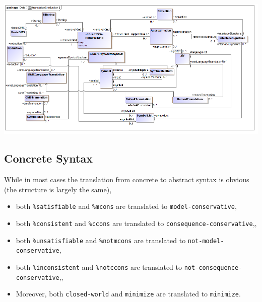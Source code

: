 \documentclass[10pt,fleqn,final]{scrreprt}
\makeatletter
\newcommand*\CommentAuthor{}
\renewcommand*\CommentAuthor{#1}}
\newcommand*\CommentDate{}
\renewcommand*\CommentDate{#1}}
\newcommand*\CommentId{}
\renewcommand*\CommentId{#1}}
\newcommand*\CommentType{}
\renewcommand*\CommentType{#1}}
\newcommand*{\SetCommentColorByType}[1]{%
\edef\localType{{#1}}%
\expandafter\ifstrequal\localType{q-aut}{\colorlet{CommentColor}{red}}{%
\expandafter\ifstrequal\localType{q-all}{\colorlet{CommentColor}{orange}}{%
\expandafter\ifstrequal\localType{todo}{\colorlet{CommentColor}{orange}}{%
\expandafter\ifstrequal\localType{fyi}{\colorlet{CommentColor}{lightgray}}{%
\colorlet{CommentColor}{yellow}}}}}}
\newcommand*{\SetCommentPrefixByType}[1]{%
\edef\localType{{#1}}%
\expandafter\@ifmtarg\localType{%
\edef\CommentPrefix{}%
}{%
\caseupper[q]{#1}%
\edef\CommentPrefix{\thestring: }%
}}
\newcommand*{\initComment}[1]{%
\setkeys{Comment}{#1}%
\SetCommentColorByType{\CommentType}%
\relax%
\SetCommentPrefixByType{\CommentType}%
\relax%
}
\newcommand*{\todonote}[2][]{%
\initComment{#1}%
\pdfcomment[author=\CommentAuthor,color=CommentColor,date=\CommentDate,id=\CommentId]{%
\CommentPrefix
#2}}
\renewcommand*{\todonote}[2][]{%
\initComment{#1}%
\ednote{\CommentPrefix #2}}
\newcommand*{\CLnote}[2][author=Christoph Lange]{%
\todonote[author=Christoph Lange,#1]{#2} 
}
\newcommand*{\syntax}[1]{\texttt{#1}}
\newcommand{\ssclause}[1]{\subsection{#1}}
\newenvironment{definitions}[0]{\medskip }{}
\makeatother
\begin{document}
\begin{definitions}
\medskip
\begin{center}
\includegraphics[scale=0.47]{mof/translation&reduction.png}
\end{center}





\ssclause{Concrete Syntax} \label{a:dol-text:OMS}


While in most cases the translation from concrete to abstract syntax
is obvious (the structure is largely the same),  
\begin{itemize}
\item both \syntax{\%satisfiable} and \syntax{\%mcons} are translated
  to \syntax{model-conservative},
\item both \syntax{\%consistent}  and \syntax{\%ccons} are translated
  to \syntax{consequence-conservative},,
\item  both   \syntax{\%unsatisfiable} and \syntax{\%notmcons} are translated to
  \syntax{not-model-conservative},
\item both \syntax{\%inconsistent}  and \syntax{\%notccons} are translated
  to \syntax{not-consequence-conservative},,
\item Moreover, both \syntax{closed-world} and \syntax{minimize} are
  translated to \syntax{minimize}.
\end{itemize}
                       

\end{definitions}
\end{document}
